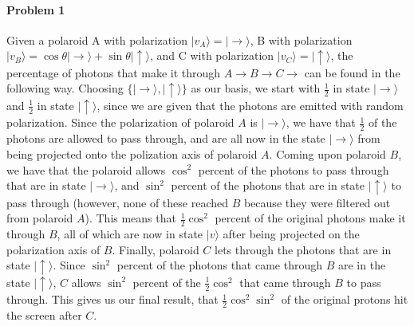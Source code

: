\documentclass[12pt]{article}
\theoremstyle{mytheor}
\begin{document}
\paragraph{Problem 1}
Given a polaroid A with polarization $|v_A\rangle = |\rightarrow\rangle$, B with polarization $|v_B\rangle = \cos\theta|\rightarrow\rangle + \sin\theta|\uparrow\rangle$, and C with polarization $|v_C\rangle = |\uparrow\rangle$, the percentage of photons that make it through $A \rightarrow B \rightarrow C \rightarrow$ can be found in the following way. Choosing $\{|\rightarrow\rangle, |\uparrow\rangle\}$ as our basis, we start with $\frac{1}{2}$ in state $|\rightarrow\rangle$ and $\frac{1}{2}$ in state $|\uparrow\rangle$, since we are given that the photons are emitted with random polarization. Since the polarization of polaroid $A$ is $|\rightarrow \rangle$, we have that $\frac{1}{2}$ of the photons are allowed to pass through, and are all now in the state $|\rightarrow \rangle$ from being projected onto the polization axis of polaroid $A$. Coming upon polaroid $B$, we have that the polaroid allows $\cos^2$ percent of the photons to pass through that are in state $|\rightarrow \rangle$, and $\sin^2$ percent of the photons that are in state $|\uparrow \rangle$ to pass through (however, none of these reached $B$ because they were filtered out from polaroid $A$). This means that $\frac{1}{2}\cos^2$ percent of the original photons make it through $B$, all of which are now in state $|v\rangle$ after being projected on the polarization axis of $B$. Finally, polaroid $C$ lets through the photons that are in state $|\uparrow \rangle$. Since $\sin^2$ percent of the photons that came through $B$ are in the state $|\uparrow \rangle$, $C$ allows $\sin^2$ percent of the $\frac{1}{2}\cos^2$ that came through $B$ to pass through. This gives us our final result, that $\frac{1}{2}\cos^2\sin^2$ of the original protons hit the screen after $C$.
\end{document}
